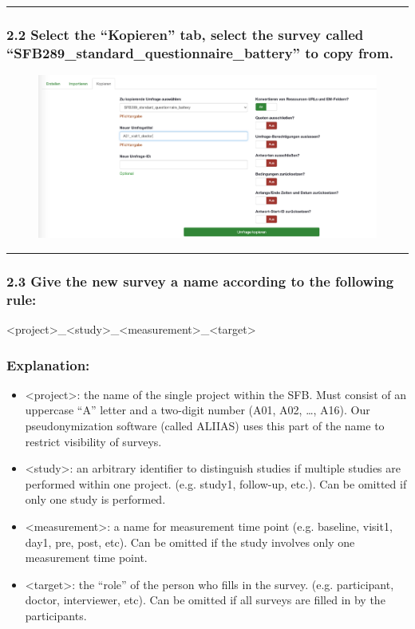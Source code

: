 \par\noindent\rule{\textwidth\color{pniblue}}{0.4pt}
\subsubsection*{2.2 Select the “Kopieren” tab, select the survey called “SFB289\_standard\_questionnaire\_battery” to copy from. }
\begin{figure}[H]
\includegraphics[width=1.0\textwidth]{docs/fig/ls_sop2.2.png}
\end{figure}

\par\noindent\rule{\textwidth\color{pniblue}}{0.4pt}
\subsubsection*{2.3 Give the new survey a name according to the following rule:} <project>\_<study>\_<measurement>\_<target>

\subsubsection*{Explanation:}
\begin{itemize}
    \item <project>: the name of the single project within the SFB. Must consist of an uppercase “A” letter and a two-digit number (A01, A02, …, A16). Our pseudonymization software (called ALIIAS) uses this part of the name to restrict visibility of surveys.
    \item <study>: an arbitrary identifier to distinguish studies if multiple studies are performed within one project. (e.g. study1, follow-up, etc.). Can be omitted if only one study is performed. 
    \item <measurement>: a name for measurement time point (e.g. baseline, visit1, day1, pre, post, etc). Can be omitted if the study involves only one measurement time point.
    \item <target>: the “role” of the person who fills in the survey. (e.g. participant, doctor, interviewer, etc). Can be omitted if all surveys are filled in by the participants.
\end{itemize}

